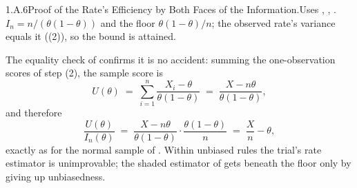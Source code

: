 \documentclass[main.tex]{subfiles}
\begin{document}
\begin{Prf}{1.A.6}{Proof of the Rate's Efficiency by Both Faces of the Information.}{Uses , , .}
      $I_n=n/(\theta(1-\theta))$ and the floor $\theta(1-\theta)/n$; the observed rate's
      variance equals it ((2)), so the bound is attained.
\item The equality check of  confirms it is no accident: summing the
      one-observation scores of step (2), the sample score is
      \[ U(\theta) \;=\; \sum_{i=1}^n \frac{X_i-\theta}{\theta(1-\theta)}
         \;=\; \frac{X-n\theta}{\theta(1-\theta)} , \]
      and therefore
      \[ \frac{U(\theta)}{I_n(\theta)}
         \;=\; \frac{X-n\theta}{\theta(1-\theta)}\cdot\frac{\theta(1-\theta)}{n}
         \;=\; \frac{X}{n}-\theta , \]
      exactly as for the normal sample of . Within unbiased rules the trial's
      rate estimator is unimprovable; the shaded estimator of  gets beneath the
      floor only by giving up unbiasedness.
\end{Prf}
\end{document}

